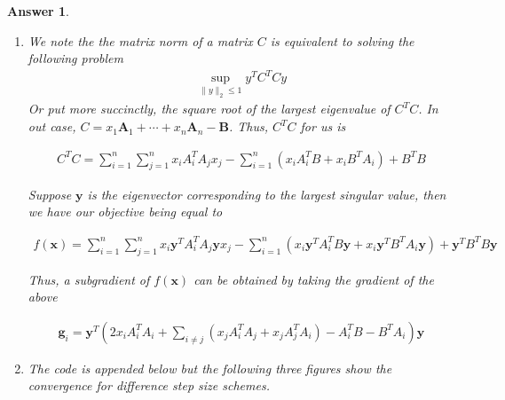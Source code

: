 \documentclass[12pt]{article}
\theoremstyle{colon}
\newtheorem*{answer}{Answer}
\begin{document}
\begin{answer}
  \

  \begin{enumerate}[label=\alph*)]
    \item We note the the matrix norm of a matrix $C$ is equivalent to solving the following problem
      \begin{gather*}
        \sup_{\lVert y \rVert_2 \leq 1} y^T C^T C y
      \end{gather*}
      Or put more succinctly, the square root of the largest eigenvalue of $C^TC$. In out case, $C = x_1 \bm{A}_1 + \cdots + x_n \bm{A}_n - \bm{B}$. Thus, $C^T C$ for us is

      \begin{gather*}
        C^TC = \sum_{i=1}^n \sum_{j=1}^n x_i A_i^T A_j x_j - \sum_{i=1}^n (x_i A_i^T B + x_i B^T A_i) + B^T B
      \end{gather*}

      Suppose $\bm{y}$ is the eigenvector corresponding to the largest singular value, then we have our objective being equal to

      \begin{gather*}
        f(\bm{x}) = \sum_{i=1}^n \sum_{j=1}^n x_i \bm{y}^T A_i^T A_j \bm{y} x_j - \sum_{i=1}^n (x_i \bm{y}^T A_i^T B \bm{y} + x_i \bm{y}^T B^T A_i \bm{y}) + \bm{y}^T B^T B \bm{y}
      \end{gather*}

      Thus, a subgradient of $f(\bm{x})$ can be obtained by taking the gradient of the above

      \begin{gather*}
        \bm{g}_i = \bm{y}^T \left( 2 x_i A_i^T A_i + \sum_{i \neq j} (x_j A_i^T A_j + x_j A_j^T A_i) - A_i^T B - B^T A_i \right) \bm{y}
      \end{gather*}

    \item The code is appended below but the following three figures show the convergence for difference step size schemes.


\end{enumerate}
\end{answer}
\end{document}

